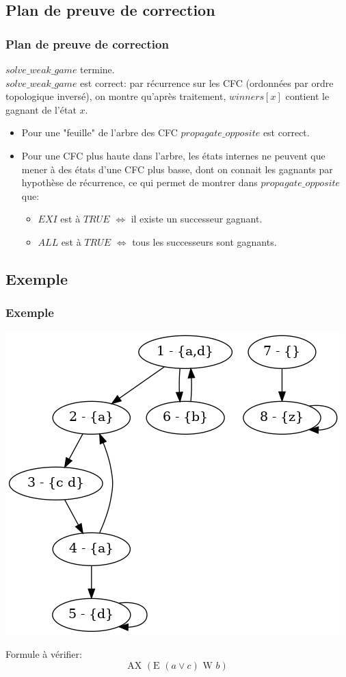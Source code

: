 \documentclass[11pt]{beamer}
\begin{document}
\subsection{Plan de preuve de correction}
\begin{frame}
	\frametitle{Plan de preuve de correction}
	$solve\_weak\_game$ termine. \\
	\bigskip \pause
	$solve\_weak\_game$ est correct: par récurrence sur les CFC (ordonnées par ordre topologique inversé), on montre qu'après traitement, $winners[x]$ contient le gagnant de l'état $x$.
	\begin{itemize}
		\item Pour une "feuille" de l'arbre des CFC $propagate\_opposite$ est correct.
		\item Pour une CFC plus haute dans l'arbre, les états internes ne peuvent que mener à des états d'une CFC plus basse, dont on connait les gagnants par hypothèse de récurrence, ce qui permet de montrer dans $propagate\_opposite$ que:
		\begin{itemize}
			\item $EXI$ est à $TRUE$ $\iff$ il existe un successeur gagnant.
			\item $ALL$ est à $TRUE$ $\iff$ tous les successeurs sont gagnants.
		\end{itemize}
	\end{itemize}
\end{frame}

\subsection{Exemple}
\begin{frame}
	\frametitle{Exemple}
	\begin{center}
	\includegraphics[scale=0.35]{imgs/g2.png}
	\end{center}
Formule à vérifier:
	$$ \mbox{AX } (\mbox{E } (a \lor c) \mbox{ W } b) $$
\end{frame}
\end{document}
